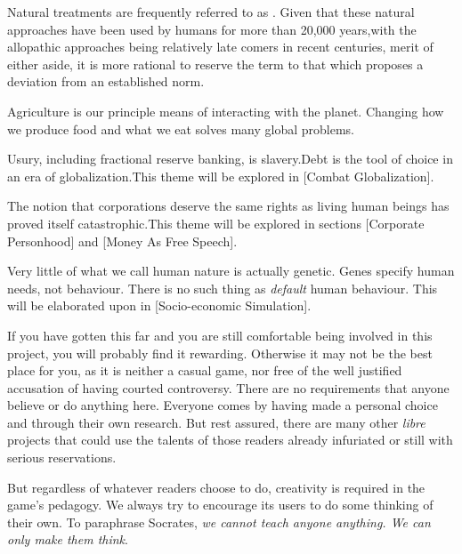 Natural treatments are frequently referred to as . Given that these natural approaches have been used by humans for more than 20,000 years,\footnotecite[hardy2012] with the allopathic approaches being relatively late comers in recent centuries, merit of either aside, it is more rational to reserve the term  to that which proposes a deviation from an established norm.


Agriculture is our principle means of interacting with the planet. Changing how we produce food and what we eat solves many global problems.\footnotecite[foodwaste]


Usury, including fractional reserve banking, is slavery. Debt is the tool of choice in an era of globalization.\footnotecite[perkins2005] This theme will be explored in [Combat Globalization].


The notion that corporations deserve the same rights as living human beings has proved itself catastrophic. This theme will be explored in sections \in{}[Corporate Personhood] and \in{}[Money As Free Speech].


Very little of what we call human nature is actually genetic. Genes specify human needs, not behaviour. There is no such thing as {\it default} human behaviour. This will be elaborated upon in [Socio-economic Simulation].
\stopitemize

If you have gotten this far and you are still comfortable being involved in this project, you will probably find it rewarding. Otherwise it may not be the best place for you, as it is neither a casual game, nor free of the well justified accusation of having courted controversy. There are no requirements that anyone believe or do anything here. Everyone comes by having made a personal choice and through their own research. But rest assured, there are many other {\it libre} projects that could use the talents of those readers already infuriated or still with serious reservations.

But regardless of whatever readers choose to do, creativity is required in the game's pedagogy. We always try to encourage its users to do some thinking of their own. To paraphrase Socrates, {\it we cannot teach anyone anything. We can only make them think}.

\StopChapter

